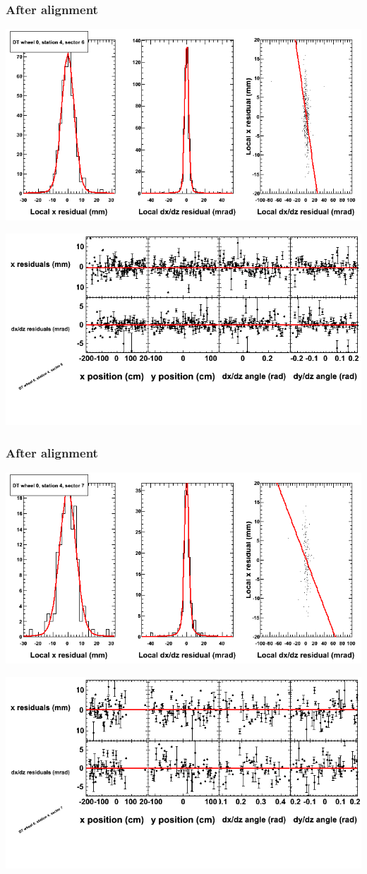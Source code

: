 \documentclass[compress]{beamer}
\begin{document}
\begin{frame}
\frametitle{After alignment}
\includegraphics[width=0.7\linewidth]{NOV4_fitfunctions/MBwhCst4sec06_bellcurves.png}

\includegraphics[width=0.7\linewidth]{NOV4_fitfunctions/MBwhCst4sec06_polynomials.png}
\end{frame}

\begin{frame}
\frametitle{After alignment}
\includegraphics[width=0.7\linewidth]{NOV4_fitfunctions/MBwhCst4sec07_bellcurves.png}

\includegraphics[width=0.7\linewidth]{NOV4_fitfunctions/MBwhCst4sec07_polynomials.png}
\end{frame}
\end{document}
